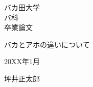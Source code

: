 \begin{titlepage}
    \begin{center}
        \Huge{
            バカ田大学 \\
            バ科 \\
            卒業論文
        }

        \vspace{160truept}

        \Huge{
            バカとアホの違いについて
        }

        \vspace{160truept}

        \huge{20XX年1月}

        \vspace{10truept}

        \huge{坪井正太郎}
    \end{center}
\end{titlepage}
